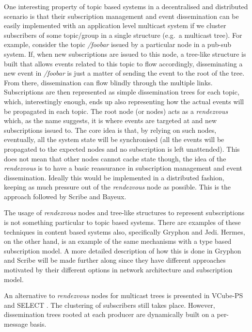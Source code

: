 One interesting property of topic based systems in a decentralised and
distributed scenario is that their subscription management and event
dissemination can be easily implemented with an application level
multicast system if we cluster subscribers of some topic/group in a
single structure (e.g.~a multicast tree). For example, consider the
topic \emph{/foobar} issued by a particular node in a pub-sub system.
If, when new subscriptions are issued to this node, a tree-like
structure is built that allows events related to this topic to flow
accordingly, disseminating a new event in \emph{/foobar} is just a
matter of sending the event to the root of the tree. From there,
dissemination can flow blindly through the multiple links. Subscriptions
are then represented as simple dissemination trees for each topic,
which, interestingly enough, ends up also representing how the actual
events will be propagated in each topic. The root node (or nodes) acts
as a \emph{rendezvous} which, as the name suggests, it is where events
are targeted at and new subscriptions issued to. The core idea is that,
by relying on such nodes, eventually, all the system state will be
synchronised (all the events will be propagated to the expected nodes
and no subscription is left unattended). This does not mean that other
nodes cannot cache state though, the idea of the \emph{rendezvous} is to
have a basic reassurance in subscription management and event
dissemination. Ideally this would be implemented in a distributed
fashion, keeping as much pressure out of the \emph{rendezvous} node as
possible. This is the approach followed by Scribe and Bayeux.

The usage of \emph{rendezvous} nodes and tree-like structures to represent
subscriptions is not something particular to topic based systems. There are
examples of these techniques in content based systems also, specifically
Gryphon and Jedi. Hermes, on the other hand, is an example of the same
mechanisms with a type based subscription model. A more detailed description of
how this is done in Gryphon and Scribe will be made further along since they
have different approaches motivated by their different options in network
architecture and subscription model.

An alternative to \emph{rendezvous} nodes for multicast trees is presented in
VCube-PS \cite{DeAraujo2017} and SELECT \cite{Apolonia2018}. The clustering of
subscribers still takes place.  However, dissemination trees rooted at each
producer are dynamically built on a per-message basis.

